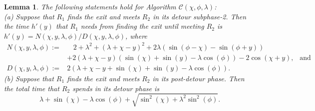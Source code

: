 \documentclass[
final
]{dmtcs-episciences}
\newcommand{\sinn}[1]{\sin \left({#1}\right)}
\newcommand{\coss}[1]{\cos \left({#1}\right)}
\newcommand{\RA}{\ensuremath{R_1}}
\newcommand{\RB}{\ensuremath{R_2 }}
\newtheorem{lemma}[theorem]{Lemma}
\theoremstyle{definition}
\begin{document}
\begin{lemma}\label{lem: quantities from algo C}
The following statements hold for Algorithm $\mathcal C(\chi, \phi, \lambda)$: \\
(a) Suppose that $\RA$ finds the exit and meets $\RB$ in its detour subphase-2. Then the time $h'(y)$ that 
$\RA$ needs from finding the exit until meeting $\RB$ is $h'(y) = N(\chi, y, \lambda, \phi) / D(\chi, y, \lambda, \phi)$, where
\begin{align*}
N(\chi, y, \lambda, \phi):=
&
~~~~2+\lambda^2+(\lambda+\chi-y)^2+2 \lambda (\sinn{\phi-\chi}-\sinn{\phi+y}) \\
&+2 (\lambda+\chi-y) (\sinn{\chi}+\sinn{y} 
	- \lambda \coss{\phi})-2 \coss{\chi+y}, \ \ \mbox{ and} \\
D(\chi, y, \lambda, \phi):=
&2 (\lambda+\chi - y +\sinn{\chi}+\sinn{y} -\lambda \coss{\phi}).
\end{align*}
(b) Suppose that $\RA$ finds the exit and meets $\RB$ in its post-detour phase. 
Then the total time that $\RB$ spends in its detour phase is
$$
\lambda+\sinn{\chi}-\lambda\coss{\phi}+\sqrt{\sin^2(\chi)+\lambda^2\sin^2(\phi)}.
$$
\end{lemma}
\end{document}
